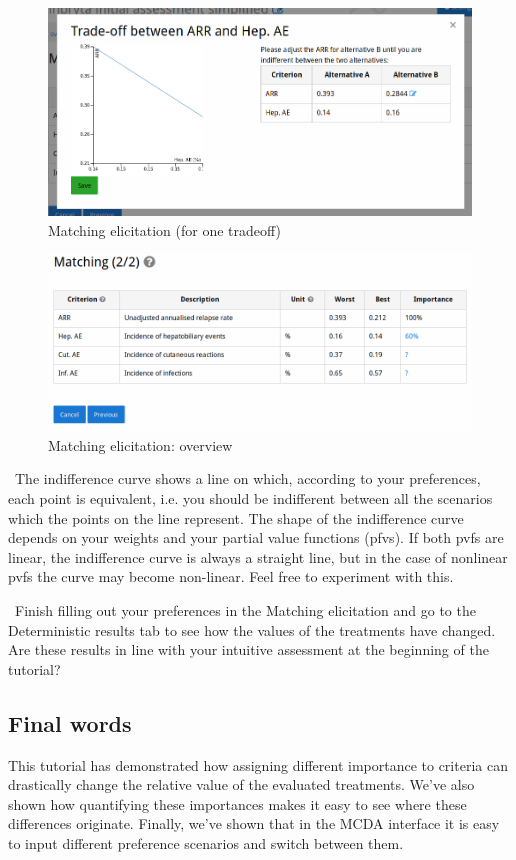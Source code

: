 \documentclass[00_mcda_tutorial.tex]{subfiles}
\begin{document}
\begin{figure}[!h]
    \centering
	\includegraphics[width=\textwidth]{fig/matching1.png}
    \caption{Matching elicitation (for one tradeoff)}
	\label{fig:matching1}
\end{figure}

\begin{figure}[!h]
    \centering
	\includegraphics[width=\textwidth]{fig/matching2.png}
    \caption{Matching elicitation: overview}
	\label{fig:matching2}
\end{figure}

\noindent \faGraduationCap \, The indifference curve shows a line on which, according to your preferences, each point is equivalent, i.e. you should be indifferent between all the scenarios which the points on the line represent. The shape of the indifference curve depends on your weights and your partial value functions (pfvs). If both pvfs are linear, the indifference curve is always a straight line, but in the case of nonlinear pvfs the curve may become non-linear. Feel free to experiment with this.
\newline

\noindent \leftpointright \, Finish filling out your preferences in the Matching elicitation and go to the Deterministic results tab to see how the values of the treatments have changed. Are these results in line with your intuitive assessment at the beginning of the tutorial?

\subsection*{Final words}
This tutorial has demonstrated how assigning different importance to criteria can drastically change the relative value of the evaluated treatments. We’ve also shown how quantifying these importances makes it easy to see where these differences originate. Finally, we’ve shown that in the MCDA interface it is easy to input different preference scenarios and switch between them.
\end{document}
